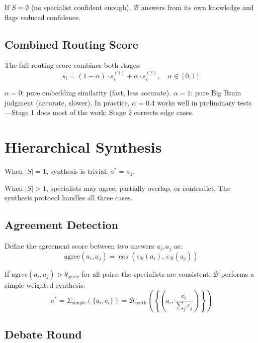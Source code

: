\documentclass[12pt]{article}
\begin{document}
If $S = \emptyset$ (no specialist confident enough), $\mathcal{B}$ answers from its own knowledge and flags reduced confidence.

\subsection{Combined Routing Score}

The full routing score combines both stages:
\begin{equation}
s_i = (1-\alpha) \cdot s_i^{(1)} + \alpha \cdot s_i^{(2)}, \quad \alpha \in [0,1]
\end{equation}

$\alpha = 0$: pure embedding similarity (fast, less accurate). $\alpha = 1$: pure Big Brain judgment (accurate, slower). In practice, $\alpha = 0.4$ works well in preliminary tests---Stage 1 does most of the work; Stage 2 corrects edge cases.

\section{Hierarchical Synthesis}
\label{sec:synthesis}

When $|S| = 1$, synthesis is trivial: $a^* = a_1$.

When $|S| > 1$, specialists may agree, partially overlap, or contradict. The synthesis protocol handles all three cases.

\subsection{Agreement Detection}

Define the agreement score between two answers $a_i, a_j$ as:
\begin{equation}
\text{agree}(a_i, a_j) = \cos(e_\mathcal{B}(a_i),\, e_\mathcal{B}(a_j))
\end{equation}

If $\text{agree}(a_i, a_j) > \theta_{\text{agree}}$ for all pairs: the specialists are consistent. $\mathcal{B}$ performs a simple weighted synthesis:
\begin{equation}
a^* = \Sigma_{\text{simple}}(\{a_i, c_i\}) = \mathcal{B}_{\text{synth}}\!\left(\left\{\left(a_i, \frac{c_i}{\sum_j c_j}\right)\right\}\right)
\end{equation}

\subsection{Debate Round}
\end{document}
